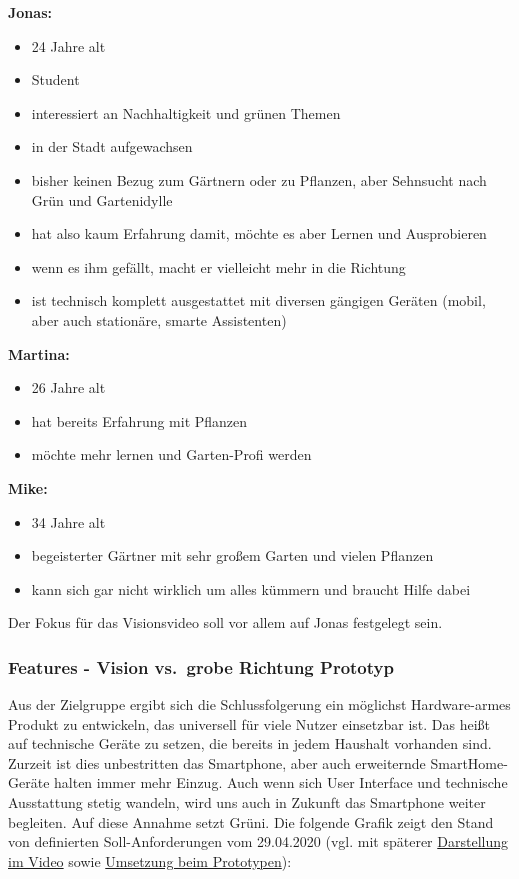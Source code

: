 \textbf{Jonas:}

\begin{itemize}
\tightlist
\item
  24 Jahre alt
\item
  Student
\item
  interessiert an Nachhaltigkeit und grünen Themen
\item
  in der Stadt aufgewachsen
\item
  bisher keinen Bezug zum Gärtnern oder zu Pflanzen, aber Sehnsucht nach
  Grün und Gartenidylle
\item
  hat also kaum Erfahrung damit, möchte es aber Lernen und Ausprobieren
\item
  wenn es ihm gefällt, macht er vielleicht mehr in die Richtung
\item
  ist technisch komplett ausgestattet mit diversen gängigen Geräten
  (mobil, aber auch stationäre, smarte Assistenten)
\end{itemize}

\textbf{Martina:}

\begin{itemize}
\tightlist
\item
  26 Jahre alt
\item
  hat bereits Erfahrung mit Pflanzen
\item
  möchte mehr lernen und Garten-Profi werden
\end{itemize}

\textbf{Mike:}

\begin{itemize}
\tightlist
\item
  34 Jahre alt
\item
  begeisterter Gärtner mit sehr großem Garten und vielen Pflanzen
\item
  kann sich gar nicht wirklich um alles kümmern und braucht Hilfe dabei
\end{itemize}

Der Fokus für das Visionsvideo soll vor allem auf Jonas festgelegt sein.

\hypertarget{features1}{%
\subsubsection{Features - Vision vs.~grobe Richtung
Prototyp}\label{features1}}

Aus der Zielgruppe ergibt sich die Schlussfolgerung ein möglichst
Hardware-armes Produkt zu entwickeln, das universell für viele Nutzer
einsetzbar ist. Das heißt auf technische Geräte zu setzen, die bereits
in jedem Haushalt vorhanden sind. Zurzeit ist dies unbestritten das
Smartphone, aber auch erweiternde SmartHome-Geräte halten immer mehr
Einzug. Auch wenn sich User Interface und technische Ausstattung stetig
wandeln, wird uns auch in Zukunft das Smartphone weiter begleiten. Auf
diese Annahme setzt Grüni. Die folgende Grafik zeigt den Stand von
definierten Soll-Anforderungen vom 29.04.2020 (vgl. mit späterer
\protect\hyperlink{ux5cux23ux5cux23Interaktionsgestaltung}{Darstellung
im Video} sowie \protect\hyperlink{ux5cux23Umsetzung}{Umsetzung beim
Prototypen}):

